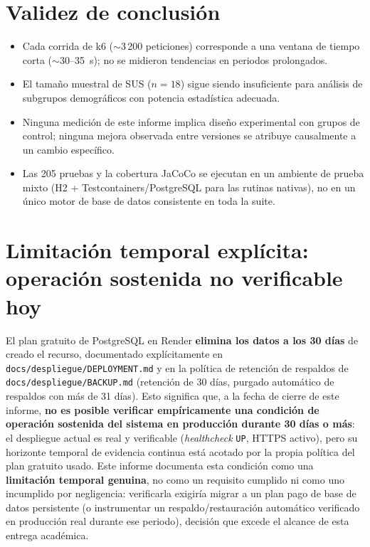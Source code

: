\section{Validez de conclusi\'on}

\begin{itemize}[nosep]
  \item Cada corrida de k6 ($\sim$3\,200 peticiones) corresponde a una
    ventana de tiempo corta ($\sim$30--35~s); no se midieron tendencias en
    periodos prolongados.
  \item El tama\~no muestral de SUS ($n=18$) sigue siendo insuficiente para
    an\'alisis de subgrupos demogr\'aficos con potencia estad\'istica
    adecuada.
  \item Ninguna medici\'on de este informe implica dise\~no experimental
    con grupos de control; ninguna mejora observada entre versiones se
    atribuye causalmente a un cambio espec\'ifico.
  \item Las 205 pruebas y la cobertura JaCoCo se ejecutan en un ambiente
    de prueba mixto (H2 + Testcontainers/PostgreSQL para las rutinas
    nativas), no en un \'unico motor de base de datos consistente en toda
    la suite.
\end{itemize}

\section{Limitaci\'on temporal expl\'icita: operaci\'on sostenida no verificable hoy}
\label{sec:limitacion-30-dias}

El plan gratuito de PostgreSQL en Render \textbf{elimina los datos a los 30
d\'ias} de creado el recurso, documentado expl\'icitamente en
\texttt{docs/despliegue/DEPLOYMENT.md} y en la pol\'itica de retenci\'on de
respaldos de \texttt{docs/despliegue/BACKUP.md} (retenci\'on de 30 d\'ias,
purgado autom\'atico de respaldos con m\'as de 31 d\'ias). Esto significa
que, a la fecha de cierre de este informe, \textbf{no es posible verificar
emp\'iricamente una condici\'on de operaci\'on sostenida del sistema en
producci\'on durante 30 d\'ias o m\'as}: el despliegue actual es real y
verificable (\emph{healthcheck} \texttt{UP}, HTTPS activo), pero su
horizonte temporal de evidencia continua est\'a acotado por la propia
pol\'itica del plan gratuito usado. Este informe documenta esta condici\'on
como una \textbf{limitaci\'on temporal genuina}, no como un requisito
cumplido ni como uno incumplido por negligencia: verificarla exigir\'ia
migrar a un plan pago de base de datos persistente (o instrumentar un
respaldo/restauraci\'on autom\'atico verificado en producci\'on real durante
ese periodo), decisi\'on que excede el alcance de esta entrega acad\'emica.

